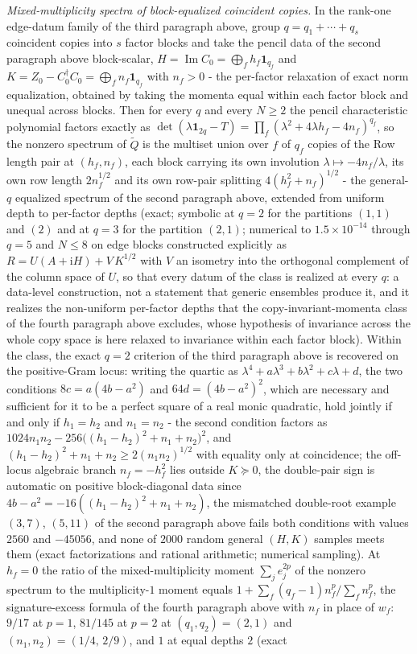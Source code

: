 \emph{Mixed-multiplicity spectra of block-equalized coincident copies.} In the rank-one edge-datum family of the third paragraph above, group \(q=q_1+\cdots+q_s\) coincident copies into \(s\) factor blocks and take the pencil data of the second paragraph above block-scalar, \(H=\operatorname{Im}C_0=\bigoplus_f h_f\mathbf 1_{q_f}\) and \(K=Z_0-C_0^\dagger C_0=\bigoplus_f n_f\mathbf 1_{q_f}\) with \(n_f>0\) - the per-factor relaxation of exact norm equalization, obtained by taking the momenta equal within each factor block and unequal across blocks. Then for every \(q\) and every \(N\ge2\) the pencil characteristic polynomial factors exactly as \(\det(\lambda\mathbf 1_{2q}-T)=\prod_f(\lambda^{2}+4\lambda h_f-4n_f)^{q_f}\), so the nonzero spectrum of \(\widetilde Q\) is the multiset union over \(f\) of \(q_f\) copies of the Row length pair at \((h_f,n_f)\), each block carrying its own involution \(\lambda\mapsto-4n_f/\lambda\), its own row length \(2n_f^{1/2}\) and its own row-pair splitting \(4(h_f^{2}+n_f)^{1/2}\) - the general-\(q\) equalized spectrum of the second paragraph above, extended from uniform depth to per-factor depths (exact; symbolic at \(q=2\) for the partitions \((1,1)\) and \((2)\) and at \(q=3\) for the partition \((2,1)\); numerical to \(1.5\times10^{-14}\) through \(q=5\) and \(N\le8\) on edge blocks constructed explicitly as \(R=U(A+\mathrm iH)+V\,K^{1/2}\) with \(V\) an isometry into the orthogonal complement of the column space of \(U\), so that every datum of the class is realized at every \(q\): a data-level construction, not a statement that generic ensembles produce it, and it realizes the non-uniform per-factor depths that the copy-invariant-momenta class of the fourth paragraph above excludes, whose hypothesis of invariance across the whole copy space is here relaxed to invariance within each factor block). Within the class, the exact \(q=2\) criterion of the third paragraph above is recovered on the positive-Gram locus: writing the quartic as \(\lambda^{4}+a\lambda^{3}+b\lambda^{2}+c\lambda+d\), the two conditions \(8c=a(4b-a^{2})\) and \(64d=(4b-a^{2})^{2}\), which are necessary and sufficient for it to be a perfect square of a real monic quadratic, hold jointly if and only if \(h_1=h_2\) and \(n_1=n_2\) - the second condition factors as \(1024n_1n_2-256\bigl((h_1-h_2)^{2}+n_1+n_2\bigr)^{2}\), and \((h_1-h_2)^{2}+n_1+n_2\ge2(n_1n_2)^{1/2}\) with equality only at coincidence; the off-locus algebraic branch \(n_f=-h_f^{2}\) lies outside \(K\succeq0\), the double-pair sign is automatic on positive block-diagonal data since \(4b-a^{2}=-16((h_1-h_2)^{2}+n_1+n_2)\), the mismatched double-root example \((3,7)\), \((5,11)\) of the second paragraph above fails both conditions with values \(2560\) and \(-45056\), and none of \(2000\) random general \((H,K)\) samples meets them (exact factorizations and rational arithmetic; numerical sampling). At \(h_f=0\) the ratio of the mixed-multiplicity moment \(\sum_j e_j^{2p}\) of the nonzero spectrum to the multiplicity-\(1\) moment equals \(1+\sum_f(q_f-1)n_f^{p}/\sum_f n_f^{p}\), the signature-excess formula of the fourth paragraph above with \(n_f\) in place of \(w_f\): \(9/17\) at \(p=1\), \(81/145\) at \(p=2\) at \((q_1,q_2)=(2,1)\) and \((n_1,n_2)=(1/4,\,2/9)\), and \(1\) at equal depths \(2\) (exact 